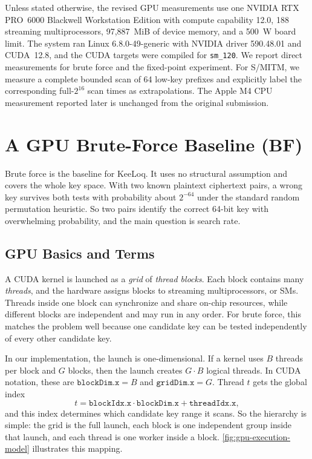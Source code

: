 \documentclass[version=preprint]{iacrcc}
\begin{document}
Unless stated otherwise, the revised GPU measurements use one NVIDIA RTX PRO~6000 Blackwell Workstation Edition with compute capability 12.0, 188 streaming multiprocessors, 97,887~MiB of device memory, and a 500~W board limit.
The system ran Linux 6.8.0-49-generic with NVIDIA driver 590.48.01 and CUDA~12.8, and the CUDA targets were compiled for \texttt{sm\_120}.
We report direct measurements for brute force and the fixed-point experiment.
For S/MITM, we measure a complete bounded scan of 64 low-key prefixes and explicitly label the corresponding full-$2^{16}$ scan times as extrapolations.
The Apple M4 CPU measurement reported later is unchanged from the original submission.

\section{A GPU Brute-Force Baseline (BF)}\label{sec:bruteforce}

Brute force is the baseline for KeeLoq.
It uses no structural assumption and covers the whole key space.
With two known plaintext ciphertext pairs, a wrong key survives both tests with probability about $2^{-64}$ under the standard random permutation heuristic.
So two pairs identify the correct 64-bit key with overwhelming probability, and the main question is search rate.

\subsection{GPU Basics and Terms}

A CUDA kernel is launched as a \emph{grid} of \emph{thread blocks}.
Each block contains many \emph{threads}, and the hardware assigns blocks to streaming multiprocessors, or SMs.
Threads inside one block can synchronize and share on-chip resources, while different blocks are independent and may run in any order.
For brute force, this matches the problem well because one candidate key can be tested independently of every other candidate key.

In our implementation, the launch is one-dimensional.
If a kernel uses $B$ threads per block and $G$ blocks, then the launch creates $G \cdot B$ logical threads.
In CUDA notation, these are $\mathtt{blockDim.x}=B$ and $\mathtt{gridDim.x}=G$.
Thread $t$ gets the global index
\[
t = \mathtt{blockIdx.x} \cdot \mathtt{blockDim.x} + \mathtt{threadIdx.x},
\]
and this index determines which candidate key range it scans.
So the hierarchy is simple: the grid is the full launch, each block is one independent group inside that launch, and each thread is one worker inside a block.
\autoref{fig:gpu-execution-model} illustrates this mapping.
\end{document}
